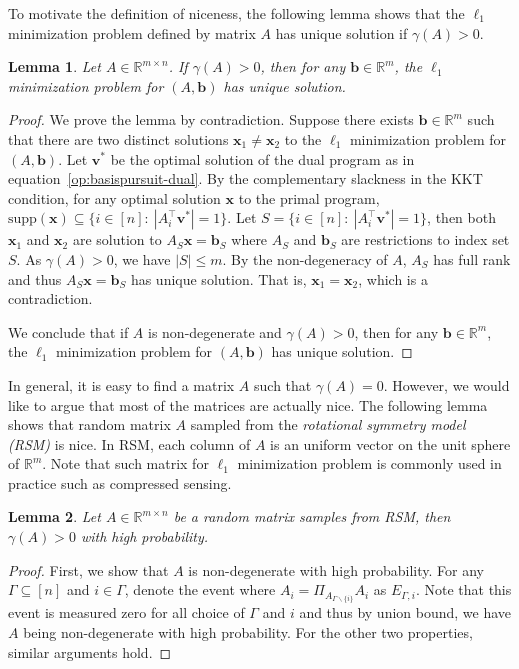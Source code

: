 \documentclass[11pt]{article}
\newtheorem{lemma}{Lemma}[section]
\theoremstyle{remark}
\theoremstyle{definition}
\newcommand{\bx}{\mathbf{x}}
\newcommand{\bb}{\mathbf{b}}
\newcommand{\bv}{\mathbf{v}}
\newcommand{\R}{{\mathbb R}} %
\begin{document}
To motivate the definition of niceness, the following lemma shows that the $\ell_1$ minimization problem defined by matrix $A$ has unique solution if $\gamma(A)>0$.
\begin{lemma}
	Let $A\in\R^{m\times n}$. If $\gamma(A)>0$, then for any $\bb\in\R^m$, the $\ell_1$ minimization problem for $(A,\bb)$ has unique solution.
\end{lemma}
\begin{proof}
	We prove the lemma by contradiction. Suppose there exists $\bb\in\R^m$ such that there are two distinct solutions $\bx_1\neq\bx_2$ to the $\ell_1$ minimization problem for $(A,\bb)$. Let $\bv^*$ be the optimal solution of the dual program as in equation~\eqref{op:basispursuit-dual}. By the complementary slackness in the KKT condition, for any optimal solution $\bx$ to the primal program, $\text{supp}(\bx)\subseteq\{i\in[n]:\ |A_i^\top\bv^*|=1 \}$. Let $S=\{i\in[n]:\ |A_i^\top\bv^*|=1 \}$, then both $\bx_1$ and $\bx_2$ are solution to $A_S\bx=\bb_S$ where $A_S$ and $\bb_S$ are restrictions to index set $S$.  As $\gamma(A)>0$, we have $|S|\leq m$. By the non-degeneracy of $A$, $A_S$ has full rank and thus $A_S\bx=\bb_S$ has unique solution. That is, $\bx_1=\bx_2$, which is a contradiction.
	
	We conclude that if $A$ is non-degenerate and $\gamma(A)>0$, then for any $\bb\in\R^m$, the $\ell_1$ minimization problem for $(A,\bb)$ has unique solution.
\end{proof}

In general, it is easy to find a matrix $A$ such that $\gamma(A)=0$. However, we would like to argue that most of the matrices are actually nice.
The following lemma shows that random matrix $A$ sampled from the \textit{rotational symmetry model (RSM)} is nice. In RSM, each column of $A$ is an uniform vector on the unit sphere of $\R^m$. Note that such matrix for $\ell_1$ minimization problem is commonly used in practice such as compressed sensing.
\begin{lemma}\label{lem:gamma lb of RSM}
	Let $A\in\R^{m\times n}$ be a random matrix samples from RSM, then $\gamma(A)>0$ with high probability.
\end{lemma}
\begin{proof}
	First, we show that $A$ is non-degenerate with high probability. For any $\Gamma\subseteq[n]$ and $i\in\Gamma$, denote the event where $A_i = \Pi_{A_{\Gamma\backslash\{i\}}}A_i$ as $E_{\Gamma,i}$. Note that this event is measured zero for all choice of $\Gamma$ and $i$ and thus by union bound, we have $A$ being non-degenerate with high probability. For the other two properties, similar arguments hold.
\end{proof}
\end{document}
